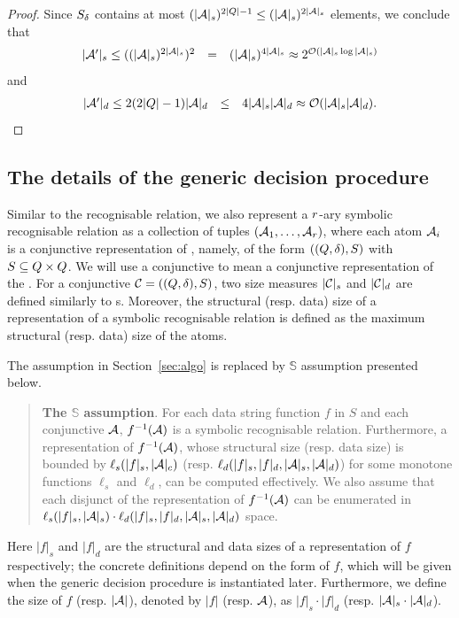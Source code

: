 \begin{proof}
Since $S_{\delta}$ contains at most $(|\mathcal{A}|_s)^{2 |Q|-1} \le (|\mathcal{A}|_s)^{2 |\mathcal{A}|_s}$ elements, we conclude that 
$$
\begin{array}{l c l}
|\mathcal{A}'|_s \le ((|\mathcal{A}|_s)^{2|\mathcal{A}|_s})^2  & = & (|\mathcal{A}|_s)^{4|\mathcal{A}|_s} 
 \approx    2^{\mathcal{O}\left(|\mathcal{A}|_s \log |\mathcal{A}|_s\right)}
\end{array}
$$ 
and 
$$
\begin{array}{l c l}
|\mathcal{A}'|_d \le 2(2|Q|-1) |\mathcal{A}|_d & \le & 4 |\mathcal{A}|_s |\mathcal{A}|_d 
\approx   \mathcal{O}( |\mathcal{A}|_s |\mathcal{A}|_d).
\end{array}
$$
\end{proof}




\subsection{The details of the generic decision procedure}


Similar to the recognisable relation, we also represent a  $r$-ary symbolic recognisable relation as a collection of tuples $(\mathcal{A}_1, \ldots, \mathcal{A}_r)$, where each atom $\mathcal{A}_i$ is a conjunctive representation of \SA{}, namely, of the form $((Q, \delta), S)$ with $S \subseteq Q \times Q$. We will use a conjunctive \SA{} to mean a conjunctive representation of the \SA{}. For a conjunctive \SA{} $\mathcal{C}= ((Q, \delta), S)$, two size measures $|\mathcal{C}|_s$ and $|\mathcal{C}|_d$ are defined similarly to \SA{}s. Moreover, the structural (resp. data) size of a representation of a symbolic recognisable relation is defined as the maximum structural (resp. data) size of the atoms.


The \prerec{} assumption in Section~\ref{sec:algo} is replaced by $\mathbb{S}$\prerec{} assumption presented below.
\begin{quote}
{\bf The $\mathbb{S}$\prerec{} assumption}. For each data string function $f$ in $S$ and each conjunctive \SA{} $\mathcal{A}$,  $f^{-1}(\mathcal{A})$ is a symbolic recognisable relation. Furthermore, 
a representation of $f^{-1}(\mathcal{A})$, whose structural size (resp. data size) is bounded by  $\ell_s(|f|_s, |\mathcal{A}|_c)$ (resp. $\ell_d(|f|_s,  |f|_d, |\mathcal{A}|_s, |\mathcal{A}|_d)$) for some monotone functions $\ell_s$ and $\ell_d$, can be computed effectively. We also assume that each disjunct of the representation of $f^{-1}(\mathcal{A})$ can be enumerated in $\ell_s(|f|_s, |\mathcal{A}|_s) \cdot \ell_d(|f|_s,  |f|_d, |\mathcal{A}|_s,  |\mathcal{A}|_d)$ space.
%
\end{quote} 
%
Here $|f|_s$ and $|f|_d$ are the structural and data sizes of a representation of $f$ respectively; the concrete definitions depend on the form of $f$, which will be given when the generic decision procedure is instantiated later. Furthermore, we define the size of $f$ (resp. $|\mathcal{A}|$), denoted by $|f|$ (resp. $\mathcal{A}$), as $|f|_s \cdot |f|_d$ (resp. $|\mathcal{A}|_s \cdot |\mathcal{A}|_d$).

